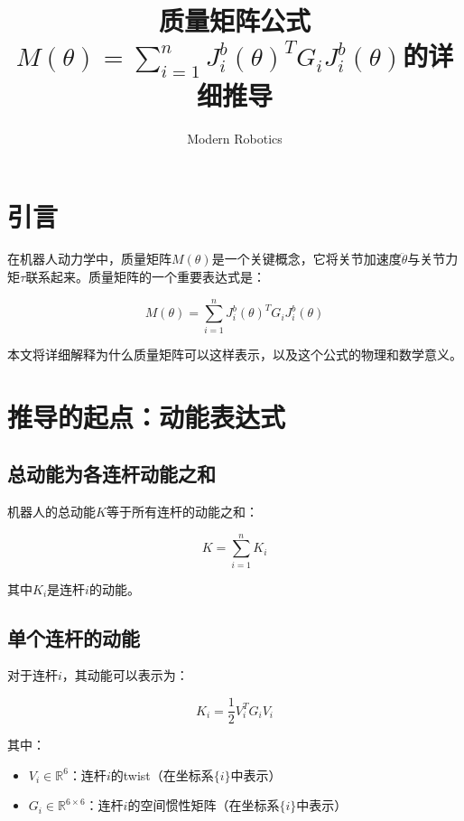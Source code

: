 \documentclass[12pt,a4paper]{article}
\title{质量矩阵公式$M(\theta) = \sum_{i=1}^{n} J_i^b(\theta)^T G_i J_i^b(\theta)$的详细推导}
\author{Modern Robotics}
\date{}
\begin{document}
\maketitle

\tableofcontents
\newpage

\section{引言}

在机器人动力学中，质量矩阵$M(\theta)$是一个关键概念，它将关节加速度$\ddot{\theta}$与关节力矩$\tau$联系起来。质量矩阵的一个重要表达式是：

\begin{equation}
M(\theta) = \sum_{i=1}^{n} J_i^b(\theta)^T G_i J_i^b(\theta)
\label{eq:mass_matrix}
\end{equation}

本文将详细解释为什么质量矩阵可以这样表示，以及这个公式的物理和数学意义。

\section{推导的起点：动能表达式}

\subsection{总动能为各连杆动能之和}

机器人的总动能$K$等于所有连杆的动能之和：

\begin{equation}
K = \sum_{i=1}^{n} K_i
\label{eq:total_kinetic_energy}
\end{equation}

其中$K_i$是连杆$i$的动能。

\subsection{单个连杆的动能}

对于连杆$i$，其动能可以表示为：

\begin{equation}
K_i = \frac{1}{2} V_i^T G_i V_i
\label{eq:link_kinetic_energy}
\end{equation}

其中：
\begin{itemize}
\item $V_i \in \mathbb{R}^6$：连杆$i$的twist（在坐标系$\{i\}$中表示）
\item $G_i \in \mathbb{R}^{6 \times 6}$：连杆$i$的空间惯性矩阵（在坐标系$\{i\}$中表示）
\end{itemize}
\end{document}
